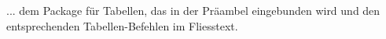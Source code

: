
... dem Package für Tabellen, das in der Präambel eingebunden wird und den entsprechenden Tabellen-Befehlen im Fliesstext.
